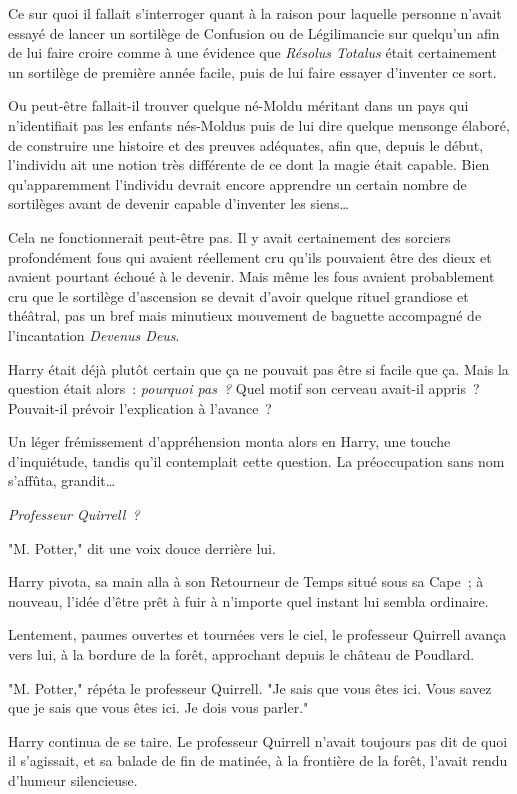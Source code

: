Ce sur quoi il fallait s'interroger quant à la raison pour laquelle personne n'avait essayé de lancer un sortilège de Confusion ou de Légilimancie sur quelqu'un afin de lui faire croire comme à une évidence que \emph{Résolus Totalus} était certainement un sortilège de première année facile, puis de lui faire essayer d'inventer ce sort.

Ou peut-être fallait-il trouver quelque né-Moldu méritant dans un pays qui n'identifiait pas les enfants nés-Moldus puis de lui dire quelque mensonge élaboré, de construire une histoire et des preuves adéquates, afin que, depuis le début, l'individu ait une notion très différente de ce dont la magie était capable. Bien qu'apparemment l'individu devrait encore apprendre un certain nombre de sortilèges avant de devenir capable d'inventer les siens…

Cela ne fonctionnerait peut-être pas. Il y avait certainement des sorciers profondément fous qui avaient réellement cru qu'ils pouvaient être des dieux et avaient pourtant échoué à le devenir. Mais même les fous avaient probablement cru que le sortilège d'ascension se devait d'avoir quelque rituel grandiose et théâtral, pas un bref mais minutieux mouvement de baguette accompagné de l'incantation \emph{Devenus Deus}.

Harry était déjà plutôt certain que ça ne pouvait pas être si facile que ça. Mais la question était alors~: \emph{pourquoi pas~?} Quel motif son cerveau avait-il appris~? Pouvait-il prévoir l'explication à l'avance~?

Un léger frémissement d'appréhension monta alors en Harry, une touche d'inquiétude, tandis qu'il contemplait cette question. La préoccupation sans nom s'affûta, grandit…

\emph{Professeur Quirrell~?}

"M. Potter," dit une voix douce derrière lui.

Harry pivota, sa main alla à son Retourneur de Temps situé sous sa Cape~; à nouveau, l'idée d'être prêt à fuir à n'importe quel instant lui sembla ordinaire.

Lentement, paumes ouvertes et tournées vers le ciel, le professeur Quirrell avança vers lui, à la bordure de la forêt, approchant depuis le château de Poudlard.

"M. Potter," répéta le professeur Quirrell. "Je sais que vous êtes ici. Vous savez que je sais que vous êtes ici. Je dois vous parler."

Harry continua de se taire. Le professeur Quirrell n'avait toujours pas dit de quoi il s'agissait, et sa balade de fin de matinée, à la frontière de la forêt, l'avait rendu d'humeur silencieuse.

